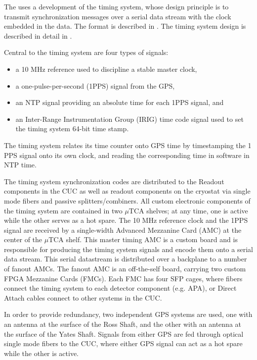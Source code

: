 The   uses a development of the  timing
system, whose design principle is to transmit synchronization messages over
a serial data stream with the clock embedded in the data. The format
is described in \cite{docid-1651}. The timing system design is
described in detail in \cite{docid-11233}.

Central to the timing system are four types of signals:
\begin{itemize}
\item a 10 MHz reference used to discipline a stable master clock,
\item a one-pulse-per-second (1PPS) signal from the GPS,
\item an NTP signal providing an absolute time for each 1PPS signal, and
\item an Inter-Range Instrumentation Group (IRIG) time code signal
  used to set the timing system 64-bit time stamp.
\end{itemize}
The timing system relates its time counter onto GPS time by
timestamping the 1 PPS signal onto its own clock, and reading
the corresponding time in software in NTP time.

The timing system synchronization codes are distributed to the 
Readout components in the CUC as well as readout components on the
cryostat via single mode fibers and passive splitters/combiners. All
custom electronic components of the timing system are contained in two
$\mu$TCA shelves; at any time, one is active while the other serves as
a hot spare. The 10 MHz reference clock and the 1PPS signal
are received by a single-width Advanced Mezzanine Card (AMC) at the
center of the $\mu$TCA shelf. This master timing AMC is a custom board
and is responsible for producing the timing system signals and encode them onto
a serial data stream. This serial datastream is distributed over a backplane to 
a number of fanout AMCs. The fanout AMC is an off-the-self board,
carrying two custom FPGA Mezzanine Cards (FMCs). Each FMC has four SFP
cages, where fibers connect the timing system to each detector
component (e.g. APA), or Direct Attach cables connect
to other systems in the CUC.

In order to provide redundancy, two independent GPS systems are used,
one with an antenna at the surface of the Ross Shaft, and the other
with an antenna at the surface of the Yates Shaft. Signals from either
GPS are fed through optical single mode fibers to the CUC, where
either GPS signal can act as a hot spare while the other is active. 

